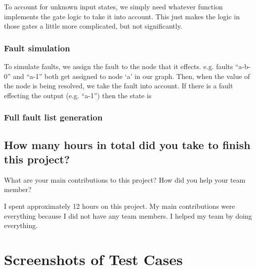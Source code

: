 \documentclass{article}
\begin{document}
                To account for unknown input states, we simply need whatever function implements the gate logic to take it into account. This just makes the logic in those gates a little more complicated, but not significantly.

                \subsubsection{Fault simulation}
                
                To simulate faults, we assign the fault to the node that it effects. e.g. faults ``a-b-0'' and ``a-1'' both get assigned to node `a' in our graph. Then, when the value of the node is being resolved, we take the fault into account. If there is a fault effecting the output (e.g. ``a-1'') then the state is 

                \subsubsection{Full fault list generation}
            
            \subsection{How many hours in total did you take to finish this project?}
            What are your main contributions to this project? How did you help your team member?
            
            I spent approximately 12 hours on this project. My main contributions were everything because I did not have any team members. I helped my team by doing everything.
            

    \section{Screenshots of Test Cases}
        \newcommand{\testtxt}[1]{}
\end{document}
